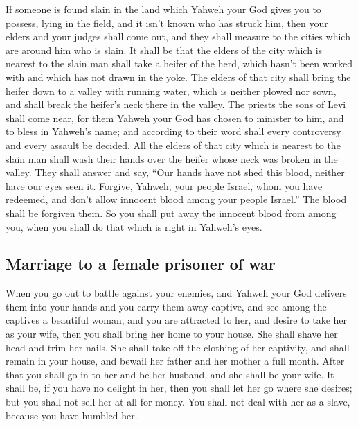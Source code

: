  If someone is found slain in the land which Yahweh your
God gives you to possess, lying in the field, and it isn't known who has
struck him,  then your elders and your judges shall come
out, and they shall measure to the cities which are around him who is
slain.  It shall be that the elders of the city which is
nearest to the slain man shall take a heifer of the herd, which hasn't
been worked with and which has not drawn in the yoke.  The
elders of that city shall bring the heifer down to a valley with running
water, which is neither plowed nor sown, and shall break the heifer's
neck there in the valley.  The priests the sons of Levi
shall come near, for them Yahweh your God has chosen to minister to him,
and to bless in Yahweh's name; and according to their word shall every
controversy and every assault be decided.  All the elders
of that city which is nearest to the slain man shall wash their hands
over the heifer whose neck was broken in the valley.  They
shall answer and say, ``Our hands have not shed this blood, neither have
our eyes seen it.  Forgive, Yahweh, your people Israel,
whom you have redeemed, and don't allow innocent blood among your people
Israel.'' The blood shall be forgiven them.  So you shall
put away the innocent blood from among you, when you shall do that which
is right in Yahweh's eyes.

\hypertarget{marriage-to-a-female-prisoner-of-war}{%
\subsection{Marriage to a female prisoner of
war}\label{marriage-to-a-female-prisoner-of-war}}

 When you go out to battle against your enemies, and
Yahweh your God delivers them into your hands and you carry them away
captive,  and see among the captives a beautiful woman,
and you are attracted to her, and desire to take her as your wife,
 then you shall bring her home to your house. She shall
shave her head and trim her nails.  She shall take off
the clothing of her captivity, and shall remain in your house, and
bewail her father and her mother a full month. After that you shall go
in to her and be her husband, and she shall be your wife.
 It shall be, if you have no delight in her, then you
shall let her go where she desires; but you shall not sell her at all
for money. You shall not deal with her as a slave, because you have
humbled her.

